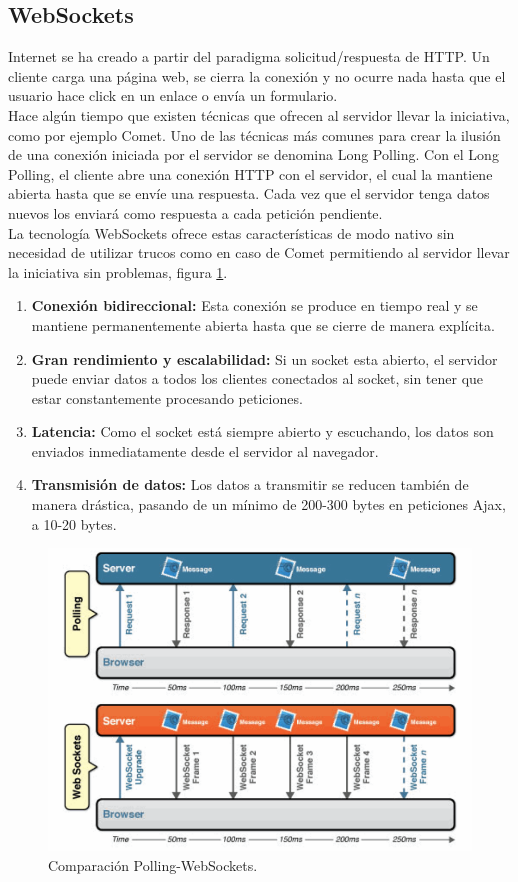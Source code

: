 \subsection{WebSockets}
Internet se ha creado a partir del paradigma solicitud/respuesta de HTTP. Un cliente carga una página web, se cierra la conexión y no ocurre nada hasta que el usuario hace click en un enlace o envía un formulario.
\\Hace algún tiempo que existen técnicas que ofrecen al servidor llevar la iniciativa, como por ejemplo Comet. Uno de las técnicas más comunes para crear la ilusión de una conexión iniciada por el servidor se denomina Long Polling. Con el Long Polling, el cliente abre una conexión HTTP con el servidor, el cual la mantiene abierta hasta que se envíe una respuesta. Cada vez que el servidor tenga datos nuevos los enviará como respuesta a cada petición pendiente.
\\La tecnología WebSockets \cite{Websockets} ofrece estas características de modo nativo sin necesidad de utilizar trucos como en caso de Comet permitiendo al servidor llevar la iniciativa sin problemas, figura \ref{fig:websocketsDiag}.
\begin{enumerate}
\item \textbf{Conexión bidireccional:} Esta conexión se produce en tiempo real y se mantiene permanentemente abierta hasta que se cierre de manera explícita.
\item \textbf{Gran rendimiento y escalabilidad:} Si un socket esta abierto, el servidor puede enviar datos a todos los clientes conectados al socket, sin tener que estar constantemente procesando peticiones.
\item \textbf{Latencia:} Como el socket está siempre abierto y escuchando, los datos son enviados inmediatamente desde el servidor al navegador.
\item \textbf{Transmisión de datos:} Los datos a transmitir se reducen también de manera drástica, pasando de un mínimo de 200-300 bytes en peticiones Ajax, a 10-20 bytes.
\end{enumerate}
\begin{figure}[!h]
\begin{center}
   \includegraphics[width=0.7\linewidth]{Figures/websocketsDiag}
  \decoRule
  \caption[Comparación Polling-WebSockets]{Comparación Polling-WebSockets.}
\label{fig:websocketsDiag}
\end{center}
\end{figure}

